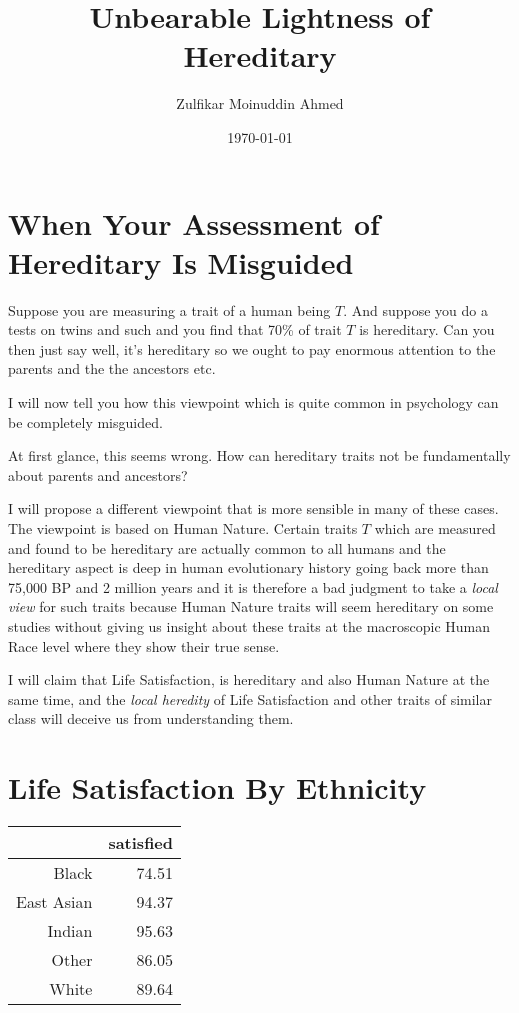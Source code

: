 \documentclass{amsart}
\title{Unbearable Lightness of Hereditary}
\author{Zulfikar Moinuddin Ahmed}
\date{\today}
\begin{document}
\maketitle

\section{When Your Assessment of Hereditary Is Misguided}

Suppose you are measuring a trait of a human being $T$.  And suppose you do a tests on twins and such and you find that 70\% of trait $T$ is hereditary.  Can you then just say well, it's hereditary so we ought to pay enormous attention to the parents and the the ancestors etc.

I will now tell you how this viewpoint which is quite common in psychology can be completely misguided.  

At first glance, this seems wrong.  How can hereditary traits not be fundamentally about parents and ancestors?

I will propose a different viewpoint that is more sensible in many of these cases.  The viewpoint is based on Human Nature.  Certain traits $T$ which are measured and found to be hereditary are actually common to all humans and the hereditary aspect is deep in human evolutionary history going back more than 75,000 BP and 2 million years and it is therefore a bad judgment to take a {\em local view} for such traits because Human Nature traits will seem hereditary on some studies without giving us insight about these traits at the macroscopic Human Race level where they show their true sense.

I will claim that Life Satisfaction, is hereditary and also Human Nature at the same time, and the {\em local heredity} of Life Satisfaction and other traits of similar class will deceive us from understanding them.

\section{Life Satisfaction By Ethnicity}

\begin{table}[ht]
\centering
\begin{tabular}{rr}
  \hline
 & satisfied \\ 
  \hline
Black & 74.51 \\ 
  East Asian & 94.37 \\ 
  Indian & 95.63 \\ 
  Other & 86.05 \\ 
  White & 89.64 \\ 
   \hline
\end{tabular}
\end{table}
\end{document}

